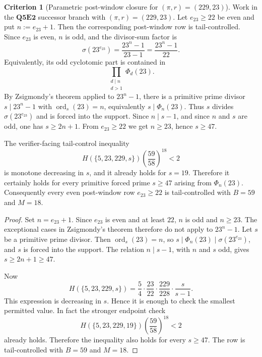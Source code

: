 \documentclass[11pt]{article}
\theoremstyle{definition}
\newtheorem{criterion}[theorem]{Criterion}
\theoremstyle{remark}
\begin{document}
\begin{criterion}[Parametric post-window closure for \texorpdfstring{\((\pi,r)=(229,23)\)}{(pi,r)=(229,23)}]
\label{crit:q5e2-pi229-r23-parametric-post-window}
Work in the \(\mathbf{Q5E2}\) successor branch with \((\pi,r)=(229,23)\).
Let \(e_{23}\ge22\) be even and put \(n:=e_{23}+1\).  Then the corresponding
post-window row is tail-controlled.  Since \(e_{23}\) is even, \(n\) is odd,
and the divisor-sum factor is
\[
  \sigma(23^{e_{23}})
  =
  \frac{23^n-1}{23-1}
  =
  \frac{23^n-1}{22}.
\]
Equivalently, its odd cyclotomic part is contained in
\[
  \prod_{\substack{d\mid n\\ d>1}}\Phi_d(23).
\]
By Zsigmondy's theorem applied to \(23^n-1\), there is a primitive prime
divisor \(s\mid23^n-1\) with \(\operatorname{ord}_s(23)=n\), equivalently
\(s\mid\Phi_n(23)\).  Thus \(s\) divides \(\sigma(23^{e_{23}})\) and is forced
into the support.  Since \(n\mid s-1\), and since \(n\) and \(s\) are odd, one
has \(s\ge2n+1\).  From \(e_{23}\ge22\) we get \(n\ge23\), hence \(s\ge47\).

The verifier-facing tail-control inequality
\[
  H(\{5,23,229,s\})
  \left(\frac{59}{58}\right)^{18}<2
\]
is monotone decreasing in \(s\), and it already holds for \(s=19\).  Therefore
it certainly holds for every primitive forced prime \(s\ge47\) arising from
\(\Phi_n(23)\).  Consequently every even post-window row \(e_{23}\ge22\) is
tail-controlled with \(B=59\) and \(M=18\).
\end{criterion}

\begin{proof}
Set \(n=e_{23}+1\).  Since \(e_{23}\) is even and at least \(22\), \(n\) is odd
and \(n\ge23\).  The exceptional cases in Zsigmondy's theorem therefore do not
apply to \(23^n-1\).  Let \(s\) be a primitive prime divisor.  Then
\(\operatorname{ord}_s(23)=n\), so
\(s\mid\Phi_n(23)\mid\sigma(23^{e_{23}})\), and \(s\) is forced into the
support.  The relation \(n\mid s-1\), with \(n\) and \(s\) odd, gives
\(s\ge2n+1\ge47\).

Now
\[
  H(\{5,23,229,s\})
  =
  \frac54\cdot\frac{23}{22}\cdot\frac{229}{228}\cdot\frac{s}{s-1}.
\]
This expression is decreasing in \(s\).  Hence it is enough to check the
smallest permitted value.  In fact the stronger endpoint check
\[
  H(\{5,23,229,19\})
  \left(\frac{59}{58}\right)^{18}<2
\]
already holds.  Therefore the inequality also holds for every \(s\ge47\).
The row is tail-controlled with \(B=59\) and \(M=18\).
\end{proof}
\end{document}
